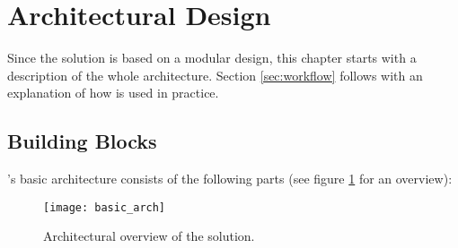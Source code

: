 \section{Architectural Design}\label{sec:arch}

Since the \app solution is based on a modular design, this chapter starts with a description of the whole architecture.
Section \ref{sec:workflow} follows with an explanation of how \app is used in practice.


\subsection{Building Blocks}\label{sec:arch:det}


\app's basic architecture consists of the following parts (see figure \ref{fig:arch_ov} for an overview):

\begin{figure}
\centering
\texttt{[image: basic\_arch]}
\caption{Architectural overview of the \app solution.}
\label{fig:arch_ov}
\end{figure}


